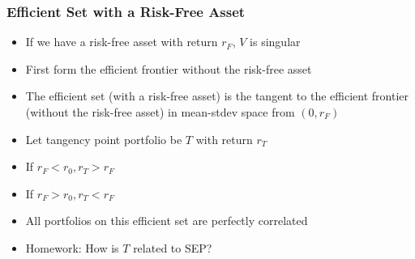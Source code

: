 \documentclass{beamer}
\begin{document}
\begin{frame}
\frametitle{Efficient Set with a Risk-Free Asset}
\begin{itemize}
\item If we have a risk-free asset with return $r_F$, $V$ is singular
\item  First form the efficient frontier without the risk-free asset
\item The efficient set (with a risk-free asset) is the tangent to the efficient frontier (without the risk-free asset) in mean-stdev space from $(0, r_F)$
\item Let tangency point portfolio be $T$ with return $r_T$
\item If $r_F < r_0, r_T > r_F$
\item If $r_F > r_0, r_T < r_F$
\item All portfolios on this efficient set are perfectly correlated
\item Homework: How is $T$ related to SEP?
\end{itemize}
\end{frame}
\end{document}
